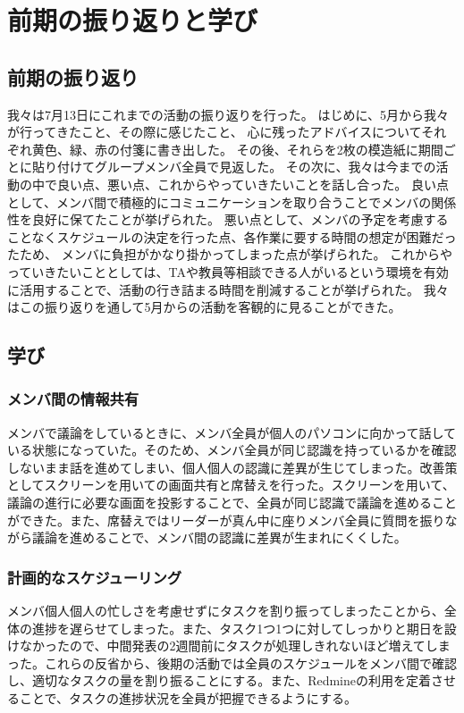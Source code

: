 \chapter{前期の振り返りと学び}

\section{前期の振り返り}
我々は7月13日にこれまでの活動の振り返りを行った。
はじめに、5月から我々が行ってきたこと、その際に感じたこと、
心に残ったアドバイスについてそれぞれ黄色、緑、赤の付箋に書き出した。
その後、それらを2枚の模造紙に期間ごとに貼り付けてグループメンバ全員で見返した。
その次に、我々は今までの活動の中で良い点、悪い点、これからやっていきたいことを話し合った。
良い点として、メンバ間で積極的にコミュニケーションを取り合うことでメンバの関係性を良好に保てたことが挙げられた。
悪い点として、メンバの予定を考慮することなくスケジュールの決定を行った点、各作業に要する時間の想定が困難だったため、
メンバに負担がかなり掛かってしまった点が挙げられた。
これからやっていきたいこととしては、TAや教員等相談できる人がいるという環境を有効に活用することで、活動の行き詰まる時間を削減することが挙げられた。
我々はこの振り返りを通して5月からの活動を客観的に見ることができた。

\section{学び}
\subsection{メンバ間の情報共有}
メンバで議論をしているときに、メンバ全員が個人のパソコンに向かって話している状態になっていた。そのため、メンバ全員が同じ認識を持っているかを確認しないまま話を進めてしまい、個人個人の認識に差異が生じてしまった。改善策としてスクリーンを用いての画面共有と席替えを行った。スクリーンを用いて、議論の進行に必要な画面を投影することで、全員が同じ認識で議論を進めることができた。また、席替えではリーダーが真ん中に座りメンバ全員に質問を振りながら議論を進めることで、メンバ間の認識に差異が生まれにくくした。
\subsection{計画的なスケジューリング}
メンバ個人個人の忙しさを考慮せずにタスクを割り振ってしまったことから、全体の進捗を遅らせてしまった。また、タスク1つ1つに対してしっかりと期日を設けなかったので、中間発表の2週間前にタスクが処理しきれないほど増えてしまった。これらの反省から、後期の活動では全員のスケジュールをメンバ間で確認し、適切なタスクの量を割り振ることにする。また、Redmineの利用を定着させることで、タスクの進捗状況を全員が把握できるようにする。
